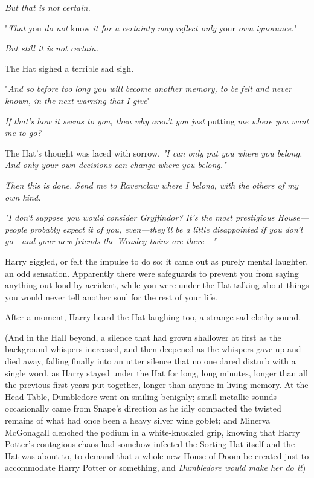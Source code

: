 \emph{But that is not certain.}

"\emph{That} you \emph{do not} know \emph{it for a certainty may reflect only}
your \emph{own ignorance.}"

\emph{But still it is not certain.}

The Hat sighed a terrible sad sigh.

"\emph{And so before too long you will become another memory, to be felt and
never known, in the next warning that I give{\el}}"

\emph{If that's how it seems to you, then why aren't you just} putting \emph{me
where you want me to go?}

The Hat's thought was laced with sorrow. \emph{"I can only put you where you
belong. And only your own decisions can change where you belong."}

\emph{Then this is done. Send me to Ravenclaw where I belong, with the others
of my own kind.}

\emph{"I don't suppose you would consider Gryffindor? It's the most prestigious
House---people probably expect it of you, even---they'll be a little
disappointed if you don't go---and your new friends the Weasley twins are
there\mbox{---}"}

Harry giggled, or felt the impulse to do so; it came out as purely mental
laughter, an odd sensation. Apparently there were safeguards to prevent you
from saying anything out loud by accident, while you were under the Hat talking
about things you would never tell another soul for the rest of your life.

After a moment, Harry heard the Hat laughing too, a strange sad clothy sound.

(And in the Hall beyond, a silence that had grown shallower at first as the
background whispers increased, and then deepened as the whispers gave up and
died away, falling finally into an utter silence that no one dared disturb with
a single word, as Harry stayed under the Hat for long, long minutes, longer
than all the previous first-years put together, longer than anyone in living
memory. At the Head Table, Dumbledore went on smiling benignly; small metallic
sounds occasionally came from Snape's direction as he idly compacted the
twisted remains of what had once been a heavy silver wine goblet; and Minerva
McGonagall clenched the podium in a white-knuckled grip, knowing that Harry
Potter's contagious chaos had somehow infected the Sorting Hat itself and the
Hat was about to, to demand that a whole new House of Doom be created just to
accommodate Harry Potter or something, and \emph{Dumbledore would make her do
it}{\el})

